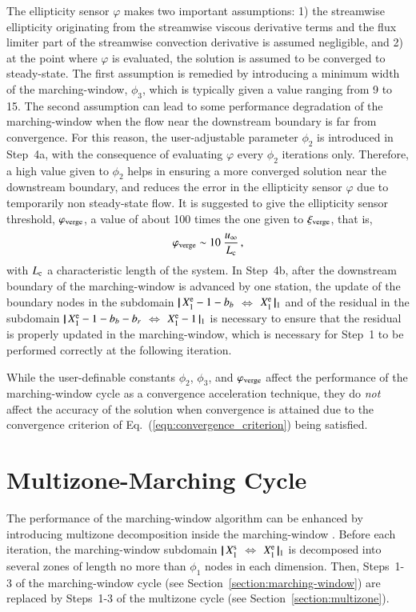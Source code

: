 \documentclass{warpdoc}
\newcommand{\bb}{{b_b}}
\newcommand{\br}{{b_r}}
\newcommand{\loope}{{\rm e}}
\newcommand{\loops}{{\rm s}}
\newcommand{\xiverge}{{\xi_{\rm verge}}}
\newcommand{\varphiverge}{{\varphi_{\rm verge}}}
\newcommand\subdomain[3]{$ | \! | \, #2 $ $\Leftrightarrow$ $#3 \, | \! |_{#1}$}
\begin{document}
%
The ellipticity sensor $\varphi$ makes two important assumptions:
1) the streamwise ellipticity originating from the streamwise viscous derivative
   terms and the flux limiter part of the streamwise convection derivative is
   assumed negligible, and
2) at the point where $\varphi$ is evaluated, the solution is assumed to be converged
   to steady-state.
The first assumption is remedied by introducing a minimum width of the marching-window,
$\phi_3$, which is typically given a value ranging from 9 to 15.
The second assumption
can lead to some performance degradation of the marching-window
when the flow near the downstream boundary is far from convergence. For this reason,
the user-adjustable parameter $\phi_2$ is introduced in Step~4a, with the consequence
of evaluating $\varphi$ every $\phi_2$ iterations only.
Therefore, a high value given to $\phi_2$ helps in ensuring a
more converged solution near the downstream boundary, and reduces the error
in the ellipticity sensor $\varphi$ due to temporarily non steady-state flow.
It is suggested to give the ellipticity sensor threshold, $\varphiverge$,
a value of about 100 times the one given to $\xiverge$, that is,
%
\begin{equation}
  \varphiverge \sim 10~\frac{u_\infty}{L_{\rm c}} \, ,
  \label{eqn:varphiverge}
\end{equation}
%
with $L_{\rm c}$ a characteristic length of the system. In Step~4b, after
the downstream boundary of the marching-window is advanced by one station,
the update of the boundary
nodes in the subdomain \subdomain{1}{X^{\loope}_1-1-\bb}{X^{\loope}_1} and
of the residual in the subdomain \subdomain{1}{X^{\loope}_1-1-\bb-\br}{X^{\loope}_1-1}
is necessary to ensure that the residual is properly updated in the marching-window,
which is necessary for Step~1 to be performed correctly at the following iteration.

While the user-definable constants $\phi_2$, $\phi_3$, and $\varphiverge$ affect
the performance of the marching-window cycle as a convergence acceleration technique,
they do \emph{not} affect the accuracy of the solution when convergence is attained
due to the convergence criterion of Eq.~(\ref{eqn:convergence_criterion}) being
satisfied.


\section{Multizone-Marching Cycle}

The performance of the marching-window algorithm can be enhanced by introducing
multizone decomposition inside the marching-window \cite{jcp:2002:parent}. Before each iteration,
the marching-window subdomain \subdomain{1}{X^{\loops}_1}{X^{\loope}_1}
is decomposed into several zones of length no more than $\phi_1$ nodes in each dimension. Then,
Steps~1-3 of the marching-window cycle (see Section~\ref{section:marching-window})
are replaced by Steps~1-3 of the multizone cycle (see Section~\ref{section:multizone}).
\end{document}
